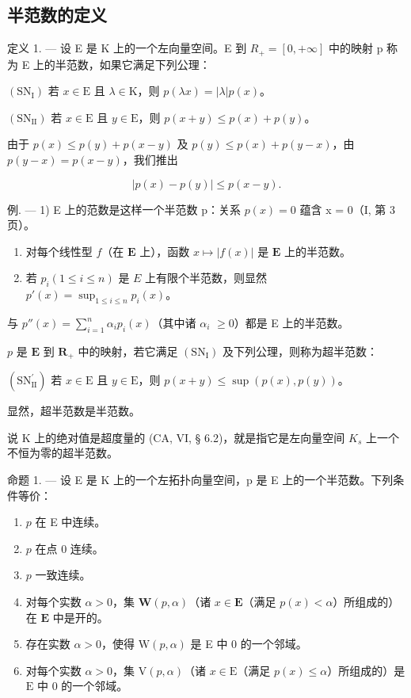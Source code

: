 \subsection{半范数的定义}

定义 1. --- 设 E 是 K 上的一个左向量空间。E 到 \(R_{+} = \left[0, +\infty\right]\) 中的映射 p 称为 E 上的半范数，如果它满足下列公理：

\((\mathrm{SN}_{\mathrm{I}})\) 若 \(x \in \mathrm{E}\) 且 \(\lambda \in \mathrm{K}\)，则 \(p(\lambda x) = |\lambda| p(x)\)。

\((\mathrm{SN}_{\mathrm{II}})\) 若 \(x \in \mathrm{E}\) 且 \(y \in \mathrm{E}\)，则 \(p(x + y) \leqslant p(x) + p(y)\)。

由于 \(p(x) \leqslant p(y) + p(x - y)\) 及 \(p(y) \leqslant p(x) + p(y - x)\)，由 \(p(y - x) = p(x - y)\)，我们推出

\[
\left| p (x) - p (y) \right| \leqslant p (x - y).\tag{1}
\]

例. --- 1) E 上的范数是这样一个半范数 p：关系 \(p(x) = 0\) 蕴含 x = 0（I, 第 3 页）。

\begin{enumerate}
\def\labelenumi{\arabic{enumi})}
\setcounter{enumi}{1}
\item
  对每个线性型 \(f\)（在 \(\mathbf{E}\) 上），函数 \(x \mapsto |f(x)|\) 是 \(\mathbf{E}\) 上的半范数。
\item
  若 \(p_i (1 \leqslant i \leqslant n)\) 是 \(E\) 上有限个半范数，则显然 \(p'(x) = \sup_{1 \leqslant i \leqslant n} p_i(x)\)。
\end{enumerate}

与 \(p''(x) = \sum_{i=1}^{n} \alpha_i p_i(x)\)（其中诸 \(\alpha_i\) \(\geqslant 0\)）都是 E 上的半范数。

\(p\) 是 \(\mathbf{E}\) 到 \(\mathbf{R}_{+}\) 中的映射，若它满足 \((\mathrm{SN}_{\mathrm{I}})\) 及下列公理，则称为超半范数：

\((\mathrm{SN}_{\mathrm{II}}^{\prime})\) 若 \(x \in \mathrm{E}\) 且 \(y \in \mathrm{E}\)，则 \(p(x + y) \leqslant \sup(p(x), p(y))\)。

显然，超半范数是半范数。

说 K 上的绝对值是超度量的 (CA, VI, § 6.2)，就是指它是左向量空间 \(K_{s}\) 上一个不恒为零的超半范数。

命题 1. --- 设 E 是 K 上的一个左拓扑向量空间，p 是 E 上的一个半范数。下列条件等价：

\begin{enumerate}
\def\labelenumi{\alph{enumi})}
\item
  \(p\) 在 E 中连续。
\item
  \(p\) 在点 0 连续。
\item
  \(p\) 一致连续。
\item
  对每个实数 \(\alpha > 0\)，集 \(\mathbf{W}(p, \alpha)\)（诸 \(x \in \mathbf{E}\)（满足 \(p(x) < \alpha\)）所组成的）在 \(\mathbf{E}\) 中是开的。
\item
  存在实数 \(\alpha > 0\)，使得 \(\mathrm{W}(p, \alpha)\) 是 E 中 0 的一个邻域。
\item
  对每个实数 \(\alpha > 0\)，集 \(\mathrm{V}(p, \alpha)\)（诸 \(x \in \mathrm{E}\)（满足 \(p(x) \leqslant \alpha\)）所组成的）是 \(\mathrm{E}\) 中 0 的一个邻域。
\end{enumerate}

